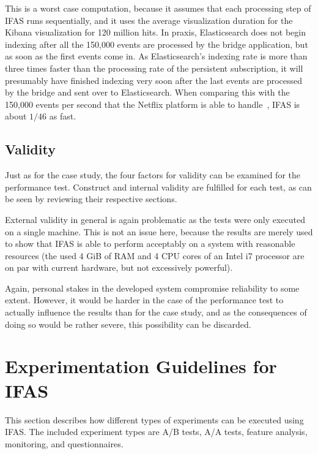 This is a worst case computation, because it assumes that each processing step of \ac{IFAS} runs sequentially, and it uses the average visualization duration for the Kibana visualization for 120 million hits.
In praxis, Elasticsearch does not begin indexing after all the 150,000 events are processed by the bridge application, but as soon as the first events come in.
As Elasticsearch's indexing rate is more than three times faster than the processing rate of the persistent subscription, it will presumably have finished indexing very soon after the last events are processed by the bridge and sent over to Elasticsearch.
When comparing this with the 150,000 events per second that the Netflix platform is able to handle~\cite{WEB:Netflix:2016}, \ac{IFAS} is about $1/46$ as fast.

\subsection{Validity}
\label{subec:evaluation:user:validity}

Just as for the case study, the four factors for validity can be examined for the performance test.
Construct and internal validity are fulfilled for each test, as can be seen by reviewing their respective sections.

External validity in general is again problematic as the tests were only executed on a single machine.
This is not an issue here, because the results are merely used to show that \ac{IFAS} is able to perform acceptably on a system with reasonable resources (the used 4 GiB of RAM and 4 CPU cores of an Intel i7 processor are on par with current hardware, but not excessively powerful).

Again, personal stakes in the developed system compromise reliability to some extent.
However, it would be harder in the case of the performance test to actually influence the results than for the case study, and as the consequences of doing so would be rather severe, this possibility can be discarded.

\section{Experimentation Guidelines for IFAS}

This section describes how different types of experiments can be executed using \ac{IFAS}.
The included experiment types are A/B tests, A/A tests, feature analysis, monitoring, and questionnaires.

